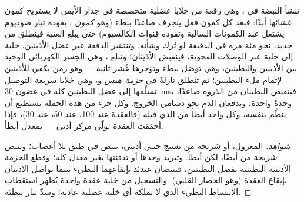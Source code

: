 \begin{proposition}\label{prop:b2:heart:conduction}
تنشأ النبضة في \emph{}، وهي رقعة من
خلايا عضلية متخصصة في جدار  الأيمن لا يستريح
كمون غشائها أبدًا: فبعد كل كمون فعل ينجرف
صاعدًا ببطء (وهو \emph{كمون }، يقوده
تيار صوديوم يشتغل عند الكمونات السالبة وتقوده قنوات
الكالسيوم) حتى يبلغ العتبة فينطلق من جديد، نحو
مئة مرة في الدقيقة لو تُرك وشأنه. وتنتشر الدفعة عبر
عضل الأذينين، خلية إلى خلية عبر الوصلات الفجوية، فينقبض
الأذينان؛ وتبلغ \emph{}، وهي
الجسر الكهربائي الوحيد بين الأذينين والبطينين، وهي توصّل
ببطء وتؤخرها عُشر ثانية --- وهو زمن يكفي للأذينين
لإتمام ملء البطينين؛ ثم تنطلق نازلةً في
\emph{حزمة هيس} و\emph{}، وهي خلايا سريعة التوصيل
تسلّمها إلى عضل البطينين كله في غضون
\qty{30}{ms}، فينقبض البطينان من الذروة صاعدًا،
وحدةً واحدة، ويدفعان الدم نحو دسامي الخروج. وكل
جزء من هذه الجملة يستطيع أن ينظّم بنفسه، وكل واحد أبطأ من
الذي قبله (فالعقدة عند 100،  عند 50،  عند
30)، فإذا أخفقت العقدة تولّى مركز أدنى --- بمعدل
أبطأ.
\end{proposition}
\begin{proof}[شواهد]
 المعزول، أو شريحة من نسيج جيبي أذيني، ينبض في طبق
بلا أعصاب؛ وتنبض شريحة من  أيضًا، لكن أبطأ.
وتبريد  وحدها أو تدفئتها يغير معدل
 كله؛ وقطع الحزمة الأذينية البطينية يفصل البطينين،
فينبضان عندئذ بإيقاعهما البطيء بينما يواصل الأذينان
بإيقاع العقدة (وهو الحصار القلبي). والتسجيل من خلية عقدة واحدة
يُظهر استقطاب الانبساط البطيء الذي لا تملكه أي خلية
عضلية عادية؛ وسدّ تيار  يبطئه.
\end{proof}

